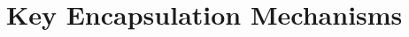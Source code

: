 \section{Key Encapsulation Mechanisms}\label{sec:key_encapsulation_mechanisms}
\vspace{7.5cm}



\vspace{-1.5mm}
\newpage
